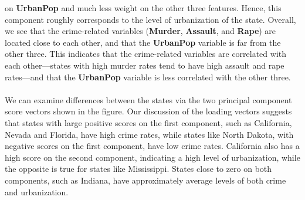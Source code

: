 on \textbf{UrbanPop} and much less weight on the other three features. Hence, this
component roughly corresponds to the level of urbanization of the state. Overall, we see that the crime-related variables (\textbf{Murder}, \textbf{Assault}, and \textbf{Rape}) are located close to each other, and that the \textbf{UrbanPop} variable is far from the other three. This indicates that the crime-related variables are correlated with each other—states with high murder rates tend to have high
assault and rape rates—and that the \textbf{UrbanPop} variable is less correlated with the other three.\\\\
We can examine differences between the states via the two principal component score vectors shown in the figure. Our discussion of the loading vectors suggests that states with large positive scores on the first component, such as California, Nevada and Florida, have high crime rates, while states like North Dakota, with negative scores on the first component, have low crime rates. California also has a high score on the second component, indicating a high level of urbanization, while the opposite is true for states like Mississippi. States close to zero on both components, such as Indiana, have approximately average levels of both crime and urbanization.

